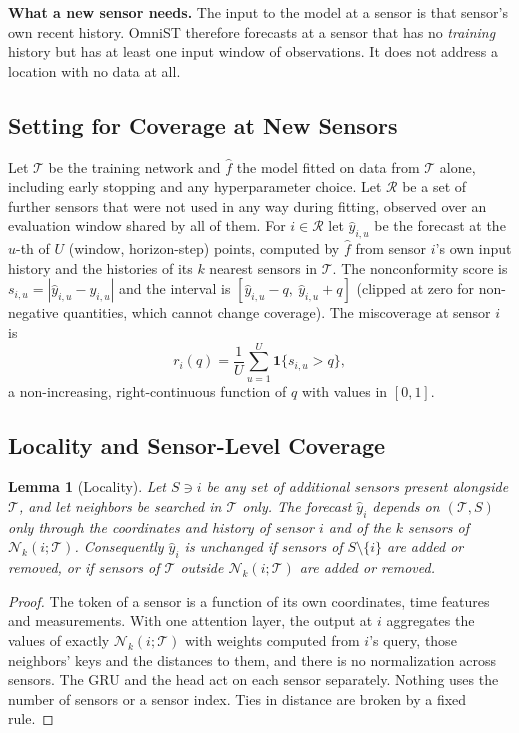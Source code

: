 \documentclass[journal,twoside,web]{ieeecolor}
\newtheorem{lemma}{Lemma}
\newcommand{\Risk}{r}
\begin{document}
\textbf{What a new sensor needs.} The input to the model at a sensor is that sensor's own recent
history. OmniST therefore forecasts at a sensor that has no \emph{training} history but has at
least one input window of observations. It does not address a location with no data at all.

\subsection{Setting for Coverage at New Sensors}
\label{sec:setting}

Let $\mathcal{T}$ be the training network and $\hat f$ the model fitted on data from $\mathcal{T}$
alone, including early stopping and any hyperparameter choice. Let $\mathcal{R}$ be a set of further
sensors that were not used in any way during fitting, observed over an evaluation window shared by
all of them. For $i\in\mathcal{R}$ let $\hat y_{i,u}$ be the forecast at the $u$-th of $U$
(window, horizon-step) points, computed by $\hat f$ from sensor $i$'s own input history and the
histories of its $k$ nearest sensors in $\mathcal{T}$. The nonconformity score is
$s_{i,u}=|\hat y_{i,u}-y_{i,u}|$ and the interval is $[\hat y_{i,u}-q,\ \hat y_{i,u}+q]$ (clipped at
zero for non-negative quantities, which cannot change coverage). The miscoverage at sensor $i$ is
\begin{equation}
\Risk_i(q)=\frac{1}{U}\sum_{u=1}^{U}\mathbf{1}\{s_{i,u}>q\},
\end{equation}
a non-increasing, right-continuous function of $q$ with values in $[0,1]$.

\subsection{Locality and Sensor-Level Coverage}
\label{sec:theory}

\begin{lemma}[Locality]
\label{lem:locality}
Let $S\ni i$ be any set of additional sensors present alongside $\mathcal{T}$, and let neighbors be
searched in $\mathcal{T}$ only. The forecast $\hat y_i$ depends on $(\mathcal{T},S)$ only through the
coordinates and history of sensor $i$ and of the $k$ sensors of $\mathcal{N}_k(i;\mathcal{T})$.
Consequently $\hat y_i$ is unchanged if sensors of $S\setminus\{i\}$ are added or removed, or if
sensors of $\mathcal{T}$ outside $\mathcal{N}_k(i;\mathcal{T})$ are added or removed.
\end{lemma}
\begin{proof}
The token of a sensor is a function of its own coordinates, time features and measurements. With one
attention layer, the output at $i$ aggregates the values of exactly $\mathcal{N}_k(i;\mathcal{T})$
with weights computed from $i$'s query, those neighbors' keys and the distances to them, and there is
no normalization across sensors. The GRU and the head act on each sensor separately. Nothing uses the
number of sensors or a sensor index. Ties in distance are broken by a fixed rule. \end{proof}
\end{document}
